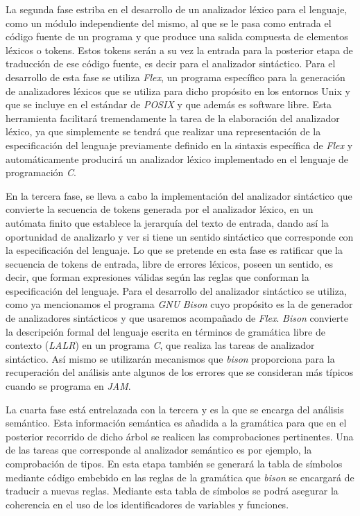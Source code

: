 \documentclass[a4paper,10pt]{article}
\begin{document}
La segunda fase estriba en el desarrollo de un analizador léxico para el lenguaje, como un módulo independiente del mismo, al que se le pasa como entrada el código fuente de un programa y que produce una salida compuesta de elementos léxicos o tokens. Estos tokens serán a su vez la entrada para la posterior etapa de traducción de ese código fuente, es decir para el analizador sintáctico. Para el desarrollo de esta fase se utiliza \textit{Flex}, un programa específico para la generación de analizadores léxicos que se utiliza para dicho propósito en los entornos Unix y que se incluye en el estándar de \textit{POSIX} y que además es software libre. Esta herramienta facilitará tremendamente la tarea de la elaboración del analizador léxico, ya que simplemente se tendrá que realizar una representación de la especificación del lenguaje previamente definido en la sintaxis específica de \textit{Flex} y automáticamente producirá un analizador léxico implementado en el lenguaje de programación \textit{C}.

En la tercera fase, se lleva a cabo la implementación del analizador sintáctico que convierte la secuencia de tokens generada por el analizador léxico, en un autómata finito que establece la jerarquía del texto de entrada, dando así la oportunidad de analizarlo y ver si tiene un sentido sintáctico que corresponde con la especificación del lenguaje. Lo que se pretende en esta fase es ratificar que la secuencia de tokens de entrada, libre de errores léxicos, poseen un sentido, es decir, que forman expresiones válidas según las reglas que conforman la especificación del lenguaje. Para el desarrollo del analizador sintáctico se utiliza, como ya mencionamos el programa \textit{GNU} \textit{Bison} cuyo propósito es la de generador de analizadores sintácticos y que usaremos acompañado de \textit{Flex}. \textit{Bison} convierte la descripción formal del lenguaje escrita en términos de gramática libre de contexto (\textit{LALR}) en un programa \textit{C}, que realiza las tareas de analizador sintáctico. Así mismo se utilizarán mecanismos que \textit{bison} proporciona para la recuperación del análisis ante algunos de los errores que se consideran más típicos cuando se programa en \textit{JAM}. 



La cuarta fase está entrelazada con la tercera y es la que se encarga del análisis semántico. Esta información semántica es añadida a la gramática para que en el posterior recorrido de dicho árbol se realicen las comprobaciones pertinentes. Una de las tareas que corresponde al analizador semántico es por ejemplo, la comprobación de tipos. En esta etapa también se generará la tabla de símbolos mediante código embebido en las reglas de la gramática que \textit{bison} se encargará de traducir a nuevas reglas. Mediante esta tabla de símbolos se podrá asegurar la coherencia en el uso de los identificadores de variables y funciones.
\end{document}
